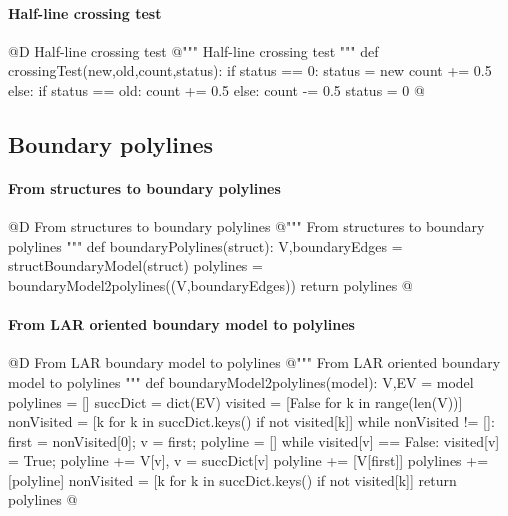 \documentclass[11pt,oneside]{article}    %
\begin{document}
\paragraph{Half-line crossing test}
@D Half-line crossing test 
@{""" Half-line crossing test """
def crossingTest(new,old,count,status):
    if status == 0:
        status = new
        count += 0.5
    else:
        if status == old: count += 0.5
        else: count -= 0.5
        status = 0
@}

\subsection{Boundary polylines}


\paragraph{From structures to boundary polylines}
@D From structures to boundary polylines
@{""" From structures to boundary polylines """
def boundaryPolylines(struct):
    V,boundaryEdges = structBoundaryModel(struct)
    polylines = boundaryModel2polylines((V,boundaryEdges))
    return polylines
@}


\paragraph{From LAR oriented boundary model to polylines}
@D From LAR boundary model to polylines
@{""" From LAR oriented boundary model to polylines """
def boundaryModel2polylines(model):
    V,EV = model
    polylines = []
    succDict = dict(EV)
    visited = [False for k in range(len(V))]
    nonVisited = [k for k in succDict.keys() if not visited[k]]
    while nonVisited != []:
        first = nonVisited[0]; v = first; polyline = []
        while visited[v] == False:
            visited[v] = True; 
            polyline += V[v], 
            v = succDict[v]
        polyline += [V[first]]
        polylines += [polyline]
        nonVisited = [k for k in succDict.keys() if not visited[k]]
    return polylines
@}
\end{document}
